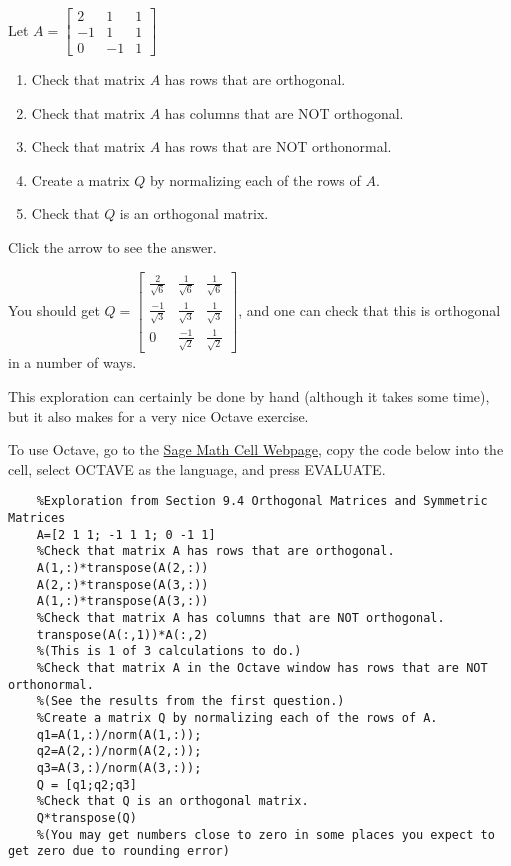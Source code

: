 \documentclass{ximera}
\begin{document}
\begin{exploration}\label{exp:make_orthogonal}
Let $A=\begin{bmatrix}
    2&1&1\\-1&1&1\\0&-1&1
\end{bmatrix}$
\begin{enumerate}
    \item Check that matrix $A$ has rows that are orthogonal.
    \item Check that matrix $A$ has columns that are NOT orthogonal.
    \item Check that matrix $A$ has rows that are NOT orthonormal.
    \item Create a matrix $Q$ by normalizing each of the rows of $A$.
    \item Check that $Q$ is an orthogonal matrix.
\end{enumerate}

Click the arrow to see the answer.
\begin{expandable}
You should get $Q = \begin{bmatrix}
\frac{2}{\sqrt{6}} & \frac{1}{\sqrt{6}} & \frac{1}{\sqrt{6}} \\
\frac{-1}{\sqrt{3}} & \frac{1}{\sqrt{3}} & \frac{1}{\sqrt{3}} \\
0 & \frac{-1}{\sqrt{2}} & \frac{1}{\sqrt{2}}
\end{bmatrix}$, and one can check that this is orthogonal in a number of ways.
\end{expandable}

This exploration can certainly be done by hand (although it takes some time), but it also makes for a very nice Octave exercise.

To use Octave, go to the \href{https://sagecell.sagemath.org/}{Sage Math Cell Webpage}, copy the code below into the cell, select OCTAVE as the language, and press EVALUATE.

\begin{verbatim}
    %Exploration from Section 9.4 Orthogonal Matrices and Symmetric Matrices
    A=[2 1 1; -1 1 1; 0 -1 1]
    %Check that matrix A has rows that are orthogonal.
    A(1,:)*transpose(A(2,:)) 
    A(2,:)*transpose(A(3,:)) 
    A(1,:)*transpose(A(3,:)) 
    %Check that matrix A has columns that are NOT orthogonal.
    transpose(A(:,1))*A(:,2) 
    %(This is 1 of 3 calculations to do.)
    %Check that matrix A in the Octave window has rows that are NOT orthonormal.
    %(See the results from the first question.)
    %Create a matrix Q by normalizing each of the rows of A.
    q1=A(1,:)/norm(A(1,:)); 
    q2=A(2,:)/norm(A(2,:));
    q3=A(3,:)/norm(A(3,:));
    Q = [q1;q2;q3]
    %Check that Q is an orthogonal matrix.
    Q*transpose(Q)
    %(You may get numbers close to zero in some places you expect to get zero due to rounding error)
\end{verbatim}
    

\end{exploration}
\end{document}
